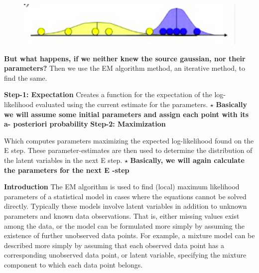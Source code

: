 \documentclass[11pt]{beamer}
\begin{document}
\begin{frame}
\begin{figure}
\includegraphics[scale=.3]{pic2.png}
\end{figure}
\textbf{But what happens, if we neither knew the source gaussian, nor their parameters?}\linebreak\linebreak
\textsf{Then we use the EM algorithm method, an iterative method, to find the same.}
\end{frame}


\begin{frame}
\textbf{Step-1: Expectation}\linebreak
\linebreak
\textsf{Creates a function for the expectation of the log-likelihood evaluated using the
current estimate for the parameters.}\linebreak
$\star$
\textbf{ Basically we will assume some initial parameters and assign each point with its a- posteriori probability}
\linebreak
\linebreak
\linebreak
\linebreak\linebreak
\textbf{Step-2: Maximization}
\linebreak

\textsf{Which computes parameters maximizing the expected log-likelihood found on the
E step. These parameter-estimates are then used to determine the distribution of
the latent variables in the next E step.}\linebreak
$\star$
\textbf{ Basically, we will again calculate the parameters for the next E -step }

\end{frame}


\begin{frame}
\textbf{Introduction}
\linebreak\linebreak
\textsf{The EM algorithm is used to find (local) maximum likelihood parameters of a
statistical model in cases where the equations cannot be solved directly. Typically
these models involve latent variables in addition to unknown parameters and known
data observations. That is, either missing values exist among the data, or the model
can be formulated more simply by assuming the existence of further unobserved
data points. For example, a mixture model can be described more simply by
assuming that each observed data point has a corresponding unobserved data
point, or latent variable, specifying the mixture component to which each data point
belongs.}
\end{frame}
\end{document}
